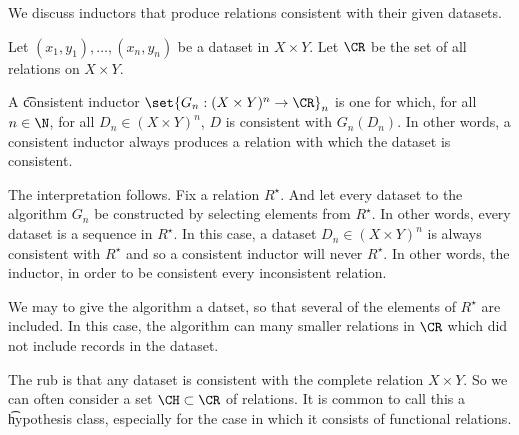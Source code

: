 

We discuss inductors that produce relations consistent with their given datasets.


Let $(x_1, y_1), \dots, (x_n, y_n)$ be a dataset in $X \times Y$.
Let $\CR$ be the set of all relations on $X \times Y$.

A \t{consistent inductor} $\set{G_n: (X \times Y)^n \to \CR}_{n}$ is one for which, for all $n \in \N$, for all $D_n \in (X \times Y)^n$, $D$ is consistent with $G_n(D_n)$.
In other words, a consistent inductor always produces a relation with which the dataset is consistent.

The interpretation follows.
Fix a relation $R^\star$.
And let every dataset  to the algorithm $G_n$ be constructed by selecting elements from $R^{\star}$.
In other words, every dataset is a sequence in $R^\star$.
In this case, a dataset $D_n \in (X \times Y)^n$ is always consistent with $R^\star$ and so a consistent inductor will never  $R^{\star}$.
In other words, the inductor, in order to be consistent  every inconsistent relation.

We may  to give the algorithm a  datset, so that several of the elements of $R^\star$ are included.
In this case, the algorithm can  many smaller relations in $\CR$ which did not include records in the dataset.



The rub is that any dataset is consistent with the complete relation $X \times Y$.
So we can often consider a set $\CH \subset \CR$ of relations.
It is common to call this a \t{hypothesis class}, especially for the case in which it consists of functional relations.
